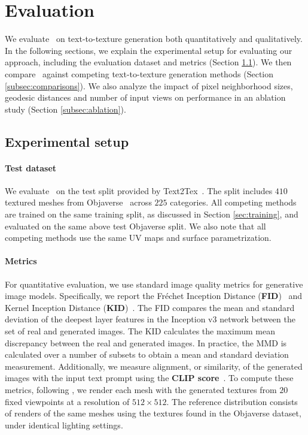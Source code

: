 \section{Evaluation}

We evaluate \method \ on text-to-texture generation both quantitatively and qualitatively. In the following sections, we explain the experimental setup for evaluating our approach, including  the evaluation dataset and metrics (Section 
\ref{subsec:experiment_setup}). We then compare \method\,  against competing 
text-to-texture generation methods (Section \ref{subsec:comparisons}). We also analyze the impact 
of pixel neighborhood sizes, geodesic distances and number of input views on performance in an ablation study (Section \ref{subsec:ablation}).


\subsection{Experimental setup}
\label{subsec:experiment_setup}


\paragraph{Test dataset}  
We evaluate \method \ on the test split provided by
Text2Tex~\cite{Chen:2023:Text2tex}. The split includes
$410$ textured meshes from Objaverse~\cite{Deitke:2023:Objaverse} across $225$ categories. All competing methods are trained on the same training split, as discussed in Section \ref{sec:training}, and evaluated on the same above test Objaverse split. We also note that all competing methods use the same UV maps and surface parametrization.

\paragraph{Metrics}
For quantitative evaluation, we use standard image quality metrics for generative image models. Specifically, we report the Fréchet Inception Distance 
(\textbf{FID})~\cite{Heusel:2017:GANs} and Kernel Inception Distance 
(\textbf{KID})~\cite{Bińkowski:2018d:Demystifying}. 
The FID compares the mean and standard deviation of the deepest layer features in the Inception v3 network between the set of real and generated images. The KID calculates the maximum mean discrepancy between the real and generated images. In practice, the MMD is calculated over a number of subsets to obtain a mean and standard deviation measurement.
Additionally, we measure 
alignment, or similarity, of the generated images with the input text prompt using the \textbf{CLIP score}~\cite{Radford:2021:CLIP}. To compute these metrics, following \cite{Zeng:2024:Paint3D}, we 
render each mesh with the generated textures from $20$ fixed viewpoints at a resolution of 
$512\times512$. The reference distribution consists of renders of the same meshes using the textures found 
in the Objaverse dataset, under identical lighting settings.


